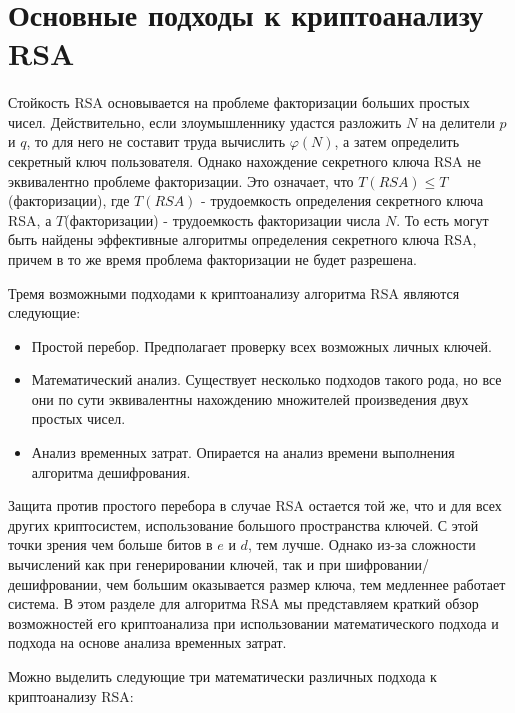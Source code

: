 
\section{Основные подходы к криптоанализу RSA}

  \paragraph{} Стойкость RSA основывается на проблеме факторизации больших простых чисел. Действительно, если злоумышленнику удастся разложить
  $N$ на делители $p$ и $q$, то для него не составит труда вычислить $\varphi(N)$, а затем определить секретный ключ пользователя. 
  Однако нахождение секретного ключа RSA не эквивалентно проблеме факторизации. Это означает, что $T(RSA) \le T$(факторизации), 
  где $T(RSA)$ - трудоемкость определения секретного ключа RSA, а $T$(факторизации) - трудоемкость факторизации числа $N$. То есть могут быть найдены эффективные алгоритмы определения секретного ключа RSA, причем в то же время проблема факторизации не будет разрешена.
  
  Тремя возможными подходами к криптоанализу алгоритма RSA являются следующие:
  
    \begin{itemize}
     \item Простой перебор. Предполагает проверку всех возможных личных ключей.
     \item Математический анализ. Существует несколько подходов такого рода, но все они по сути эквивалентны нахождению множителей произведения 
     двух простых чисел.
     \item Анализ временных затрат. Опирается на анализ времени выполнения алгоритма дешифрования.
    \end{itemize}
    
  Защита против простого перебора в случае RSA остается той же, что и для всех других криптосистем, использование большого пространства 
  ключей. С этой точки зрения чем больше битов в $e$ и $d$, тем лучше. Однако из-за сложности вычислений как при генерировании 
  ключей, так и при шифровании/дешифровании, чем большим оказывается размер ключа, тем медленнее работает система. В этом разделе для 
  алгоритма RSA мы представляем краткий обзор возможностей его криптоанализа при использовании математического подхода и подхода на основе 
  анализа временных затрат.
  
  Можно выделить следующие три математически различных подхода к криптоанализу RSA:
  
